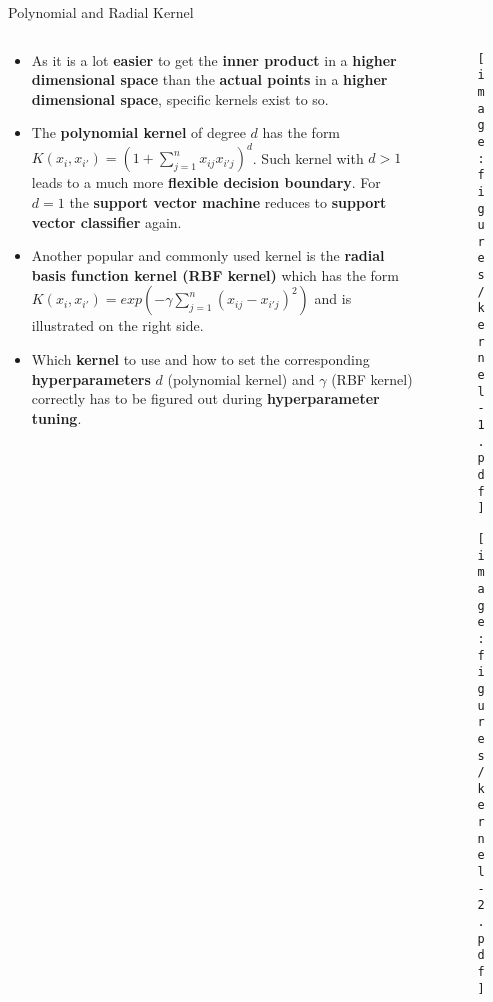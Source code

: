 \documentclass[document.tex]{subfiles}
\begin{document}
    \begin{frame}{Polynomial and Radial Kernel}
        \begin{columns}
            \begin{column}{0.6\textwidth}
                \begin{itemize}
                    \item As it is a lot \textbf{easier} to get the \textbf{inner product} in a \textbf{higher dimensional space} than the \textbf{actual points} in a \textbf{higher dimensional space}, specific kernels exist to so.
                    \item The \textbf{polynomial kernel} of degree $d$ has the form $K(x_i, x_{i'}) = (1 + \sum_{j=1}^{n} x_{ij} x_{i'j})^d$. Such kernel with $d > 1$ leads to a much more \textbf{flexible decision boundary}. For $d = 1$ the \textbf{support vector machine} reduces to \textbf{support vector classifier} again.
                    \item Another popular and commonly used kernel is the \textbf{radial basis function kernel (RBF kernel)} which has the form $K(x_i, x_{i'}) = exp(-\gamma\sum_{j=1}^{n} (x_{ij} - x_{i'j})^2)$ and is illustrated on the right side.
                    \item Which \textbf{kernel} to use and how to set the corresponding \textbf{hyperparameters} $d$ (polynomial kernel) and $\gamma$ (RBF kernel) correctly has to be figured out during \textbf{hyperparameter tuning}.
                \end{itemize}
            \end{column}
            \begin{column}{0.4\textwidth}
                \begin{figure}
                    \label{fig:kernel-1}
                    \texttt{[image: figures/kernel-1.pdf]}
                \end{figure}
                \begin{figure}
                    \label{fig:kernel-2}
                    \texttt{[image: figures/kernel-2.pdf]}
                \end{figure}
            \end{column}
        \end{columns}
    \end{frame}
    
\end{document}
